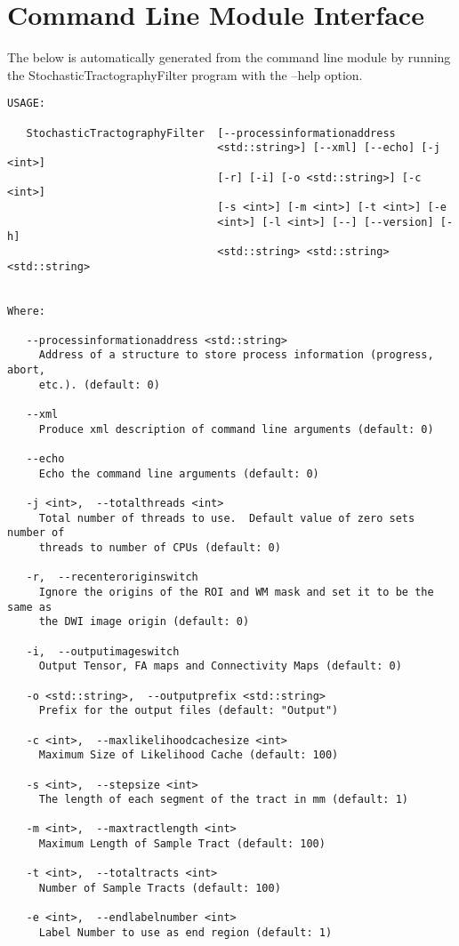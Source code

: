 \chapter{Command Line Module Interface}
The below is automatically generated from the command line module by running the StochasticTractographyFilter program with the --help option.

\begin{verbatim}
USAGE:

   StochasticTractographyFilter  [--processinformationaddress
                                 <std::string>] [--xml] [--echo] [-j <int>]
                                 [-r] [-i] [-o <std::string>] [-c <int>]
                                 [-s <int>] [-m <int>] [-t <int>] [-e
                                 <int>] [-l <int>] [--] [--version] [-h]
                                 <std::string> <std::string> <std::string>


Where:

   --processinformationaddress <std::string>
     Address of a structure to store process information (progress, abort,
     etc.). (default: 0)

   --xml
     Produce xml description of command line arguments (default: 0)

   --echo
     Echo the command line arguments (default: 0)

   -j <int>,  --totalthreads <int>
     Total number of threads to use.  Default value of zero sets number of
     threads to number of CPUs (default: 0)

   -r,  --recenteroriginswitch
     Ignore the origins of the ROI and WM mask and set it to be the same as
     the DWI image origin (default: 0)

   -i,  --outputimageswitch
     Output Tensor, FA maps and Connectivity Maps (default: 0)

   -o <std::string>,  --outputprefix <std::string>
     Prefix for the output files (default: "Output")

   -c <int>,  --maxlikelihoodcachesize <int>
     Maximum Size of Likelihood Cache (default: 100)

   -s <int>,  --stepsize <int>
     The length of each segment of the tract in mm (default: 1)

   -m <int>,  --maxtractlength <int>
     Maximum Length of Sample Tract (default: 100)

   -t <int>,  --totaltracts <int>
     Number of Sample Tracts (default: 100)

   -e <int>,  --endlabelnumber <int>
     Label Number to use as end region (default: 1)


\end{verbatim}
